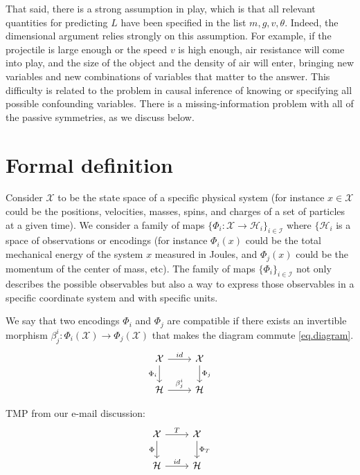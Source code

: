 \documentclass{article}
\theoremstyle{plain}
\theoremstyle{definition}
\theoremstyle{remark}
\begin{document}
That said, there is a strong assumption in play, which is that all relevant quantities for predicting $L$ have been specified in the list $m, g, v, \theta$.
Indeed, the dimensional argument relies strongly on this assumption.
For example, if the projectile is large enough or the speed $v$ is high enough, air resistance will come into play, and the size of the object and the density of air will enter, bringing new variables and new combinations of variables that matter to the answer.
This difficulty is related to the problem in causal inference of knowing or specifying all possible confounding variables.
There is a missing-information problem with all of the passive symmetries, as we discuss below.

\section{Formal definition}\label{sec:definitions}

Consider $\mathcal X$ to be the state space of a specific physical system (for instance $x\in \mathcal X$ could be the positions, velocities, masses, spins, and charges of a set of particles at a given time). 
We consider a family of maps $\{\Phi_i: \mathcal X \to \mathcal H_i\}_{i\in \mathcal I}$ where $\{\mathcal H_i$ is a space of observations or encodings (for instance $\Phi_i(x)$ could be the total mechanical energy of the system $x$ measured in Joules, and $\Phi_j(x)$ could be the momentum of the center of mass, etc).
The family of maps $\{\Phi_i\}_{i\in \mathcal I}$ not only describes the possible observables but also a way to express those observables in a specific coordinate system and with specific units. 

We say that two encodings $\Phi_i$ and $\Phi_j$ are compatible if there exists an invertible morphism $\beta_{j}^i:\Phi_i(\mathcal X)\to  \Phi_j(\mathcal X)$ that makes the diagram commute \eqref{eq.diagram}.
\begin{equation}\label{eq.diagram}
\begin{tikzcd}[]
  {\cal X}\arrow[r,"id"] \arrow[d,"\Phi_i",swap] & {\cal X}  \arrow[d,"\Phi_j"]\\
{\mathcal H} \arrow[r,"\beta_{j}^i"]  & {\mathcal H} 
\end{tikzcd}
\end{equation}

{\tiny
TMP from our e-mail discussion:
\begin{equation}\label{eq.diagram-active-passive}
\begin{tikzcd}[]
  {\cal X}\arrow[r,"T"] \arrow[d,"\Phi",swap] & {\cal X}  \arrow[d,"\Phi_T"]\\
{\mathcal H} \arrow[r,"id"] & {\mathcal H} 
\end{tikzcd}
\end{equation}
}
\end{document}
